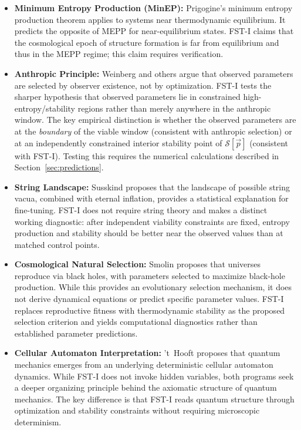 \documentclass[12pt,a4paper]{article}
\theoremstyle{remark}
\begin{document}
\begin{itemize}
    \item \textbf{Minimum Entropy Production (MinEP):} Prigogine's minimum entropy production theorem \citep{Prigogine1967} applies to systems near thermodynamic equilibrium. It predicts the opposite of MEPP for near-equilibrium states. FST-I claims that the cosmological epoch of structure formation is far from equilibrium and thus in the MEPP regime; this claim requires verification.
    \item \textbf{Anthropic Principle:} Weinberg \citep{Weinberg1987} and others argue that observed parameters are selected by observer existence, not by optimization. FST-I tests the sharper hypothesis that observed parameters lie in constrained high-entropy/stability regions rather than merely anywhere in the anthropic window. The key empirical distinction is whether the observed parameters are at the \emph{boundary} of the viable window (consistent with anthropic selection) or at an independently constrained interior stability point of $\mathcal{S}[\vec{p}]$ (consistent with FST-I). Testing this requires the numerical calculations described in Section~\ref{sec:predictions}.
    \item \textbf{String Landscape:} Susskind \citep{Susskind2005} proposes that the landscape of possible string vacua, combined with eternal inflation, provides a statistical explanation for fine-tuning. FST-I does not require string theory and makes a distinct working diagnostic: after independent viability constraints are fixed, entropy production and stability should be better near the observed values than at matched control points.
    \item \textbf{Cosmological Natural Selection:} Smolin \citep{Smolin1992} proposes that universes reproduce via black holes, with parameters selected to maximize black-hole production. While this provides an evolutionary selection mechanism, it does not derive dynamical equations or predict specific parameter values. FST-I replaces reproductive fitness with thermodynamic stability as the proposed selection criterion and yields computational diagnostics rather than established parameter predictions.
    \item \textbf{Cellular Automaton Interpretation:} 't~Hooft \citep{tHooft2016} proposes that quantum mechanics emerges from an underlying deterministic cellular automaton dynamics. While FST-I does not invoke hidden variables, both programs seek a deeper organizing principle behind the axiomatic structure of quantum mechanics. The key difference is that FST-I reads quantum structure through optimization and stability constraints without requiring microscopic determinism.
\end{itemize}
\end{document}
